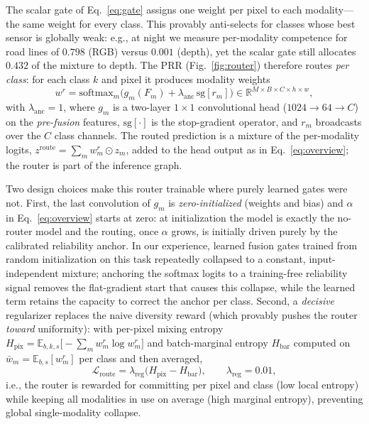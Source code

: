 The scalar gate of Eq.~\eqref{eq:gate} assigns one weight per pixel to each
modality---the same weight for every class. This provably anti-selects for
classes whose best sensor is globally weak: e.g., at night we measure
per-modality competence for road lines of $0.798$ (RGB) versus $0.001$
(depth), yet the scalar gate still allocates $0.432$ of the mixture to depth.
The PRR (Fig.~\ref{fig:router}) therefore routes \emph{per class}: for each
class $k$ and pixel it produces modality weights
\begin{equation}
w^{r} = \mathrm{softmax}_{m}\!\Big(g_m(F_m) + \lambda_{\mathrm{anc}}\,
\mathrm{sg}[r_m]\Big)\in\mathbb{R}^{M\times B\times C\times h\times w},
\label{eq:router}
\end{equation}
with $\lambda_{\mathrm{anc}}=1$, where $g_m$ is a two-layer $1{\times}1$
convolutional head ($1024\!\to\!64\!\to\!C$) on the \emph{pre-fusion}
features, $\mathrm{sg}[\cdot]$ is the stop-gradient operator, and $r_m$
broadcasts over the $C$ class channels. The routed prediction is a mixture of
the per-modality logits, $z^{\mathrm{route}}=\sum_m w^{r}_m\odot z_m$, added
to the head output as in Eq.~\eqref{eq:overview}; the router is part of the
inference graph.

Two design choices make this router trainable where purely learned gates were
not. First, the last convolution of $g_m$ is \emph{zero-initialized} (weights
and bias) and $\alpha$ in Eq.~\eqref{eq:overview} starts at zero: at
initialization the model is exactly the no-router model and the routing, once
$\alpha$ grows, is initially driven purely by the calibrated reliability
anchor. In our experience, learned fusion gates trained from random
initialization on this task repeatedly collapsed to a constant,
input-independent mixture; anchoring the softmax logits to a training-free
reliability signal removes the flat-gradient start that causes this collapse,
while the learned term retains the capacity to correct the anchor per class.
Second, a \emph{decisive} regularizer replaces the naive diversity reward
(which provably pushes the router \emph{toward} uniformity): with per-pixel
mixing entropy
$H_{\mathrm{pix}}=\mathbb{E}_{b,k,s}\big[-\sum_m w^{r}_m\log w^{r}_m\big]$
and batch-marginal entropy $H_{\mathrm{bar}}$ computed on
$\bar w_m=\mathbb{E}_{b,s}[w^{r}_m]$ per class and then averaged,
\begin{equation}
\mathcal{L}_{\mathrm{route}} =
\lambda_{\mathrm{reg}}\big(H_{\mathrm{pix}} - H_{\mathrm{bar}}\big),
\qquad \lambda_{\mathrm{reg}}=0.01,
\label{eq:routereg}
\end{equation}
i.e., the router is rewarded for committing per pixel and class (low local
entropy) while keeping all modalities in use on average (high marginal
entropy), preventing global single-modality collapse.

